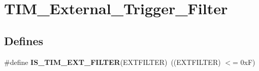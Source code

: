 \hypertarget{group__TIM__External__Trigger__Filter}{
\section{TIM\_\-External\_\-Trigger\_\-Filter}
\label{group__TIM__External__Trigger__Filter}
}
\subsection*{Defines}
\begin{DoxyCompactItemize}
\item 
\hypertarget{group__TIM__External__Trigger__Filter_ga500df0646edcf07316a55a652502ca87}{
\#define {\bfseries IS\_\-TIM\_\-EXT\_\-FILTER}(EXTFILTER)~((EXTFILTER) $<$= 0xF)}
\label{group__TIM__External__Trigger__Filter_ga500df0646edcf07316a55a652502ca87}

\end{DoxyCompactItemize}
